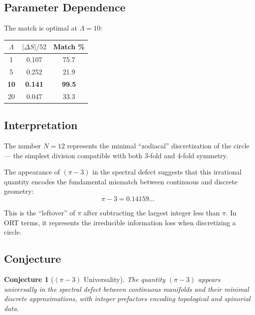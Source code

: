 \documentclass[12pt, a4paper]{article}
\newtheorem{conjecture}{Conjecture}
\begin{document}
\subsection{Parameter Dependence}

The match is optimal at $\Lambda = 10$:

\begin{center}
\begin{tabular}{ccc}
\toprule
$\Lambda$ & $|\Delta S|/52$ & Match \% \\
\midrule
1 & 0.107 & 75.7 \\
5 & 0.252 & 21.9 \\
\textbf{10} & \textbf{0.141} & \textbf{99.5} \\
20 & 0.047 & 33.3 \\
\bottomrule
\end{tabular}
\end{center}

\subsection{Interpretation}

The number $N = 12$ represents the minimal ``zodiacal'' discretization of the circle --- the simplest division compatible with both 3-fold and 4-fold symmetry.

The appearance of $(\pi - 3)$ in the spectral defect suggests that this irrational quantity encodes the fundamental mismatch between continuous and discrete geometry:
\begin{equation}
    \pi - 3 = 0.14159\ldots
\end{equation}

This is the ``leftover'' of $\pi$ after subtracting the largest integer less than $\pi$. In ORT terms, it represents the irreducible information loss when discretizing a circle.

\subsection{Conjecture}

\begin{conjecture}[$(\pi-3)$ Universality]
The quantity $(\pi - 3)$ appears universally in the spectral defect between continuous manifolds and their minimal discrete approximations, with integer prefactors encoding topological and spinorial data.
\end{conjecture}

\end{document}
